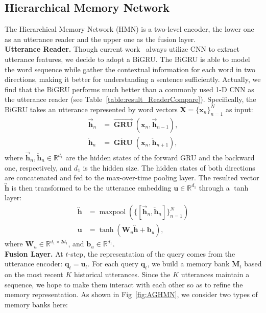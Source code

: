 \documentclass[letterpaper]{article} %
\DeclareMathOperator{\GRU}{\mathbf{GRU}}
\DeclareMathOperator{\maxpool}{maxpool}
\begin{document}
\subsection{Hierarchical Memory Network}
The Hierarchical Memory Network (HMN) is a two-level encoder, the lower one as an utterance reader and the upper one as the fusion layer. 
\\[1ex]
\noindent\textbf{Utterance Reader.}
Though current work~\cite{DBLP:conf/emnlp/HazarikaPMCZ18,DBLP:conf/naacl/HazarikaPZCMZ18,DBLP:conf/aaai/MajumderPHMGC19} always utilize CNN to extract utterance features, we decide to adopt a BiGRU. The BiGRU is able to model the word sequence while gather the contextual information for each word in two directions, making it better for understanding a sentence sufficiently. Actually, we find that the BiGRU performs much better than a commonly used 1-D CNN as the utterance reader (see Table~\ref{table:result_ReaderCompare}). Specifically, the BiGRU takes an utterance represented by word vectors $\mathbf{X}=\{\mathbf{x}_n\}_{n=1}^{N}$ as input:
\begin{align}
    \overrightarrow{\mathbf{h}}_{n} &= \overrightarrow{\GRU}(\mathbf{x}_n, \overrightarrow{\mathbf{h}}_{n-1}), \\
    \overleftarrow{\mathbf{h}}_{n} &= \overleftarrow{\GRU}(\mathbf{x}_n, \overleftarrow{\mathbf{h}}_{n+1}),
\end{align}
where $\overrightarrow{\mathbf{h}}_{n},\overleftarrow{\mathbf{h}}_{n}\in\mathbb{R}^{d_1}$ are the hidden states of the forward GRU and the backward one, respectively, and $d_1$ is the hidden size. The hidden states of both directions are concatenated and fed to the max-over-time pooling layer. The resulted vector $\overleftrightarrow{\mathbf{h}}$ is then transformed to be the utterance embedding $\mathbf{u}\in \mathbb{R}^{d_1}$ through a $\tanh$ layer:
\begin{align}
\overleftrightarrow{\mathbf{h}} &= \maxpool(\{[\overrightarrow{\mathbf{h}}_{n},\overleftarrow{\mathbf{h}}_{n}]\}_{n=1}^N) \\
\mathbf{u} &= \tanh(\mathbf{W}_u\overleftrightarrow{\mathbf{h}} + \mathbf{b}_u),
\end{align}
where $\mathbf{W}_u\in \mathbb{R}^{d_1\times 2d_1}$, and $\mathbf{b}_u\in \mathbb{R}^{d_1}$.
\\[1ex]
\noindent\textbf{Fusion Layer.}
At $t$-step, the representation of the query comes from the utterance encoder: $\mathbf{q}_t = \mathbf{u}_t$.
For each query $\mathbf{q}_t$, we build a memory bank $\mathbf{M}_t$ based on the most recent $K$ historical utterances. Since the $K$ utterances maintain a sequence, we hope to make them interact with each other so as to refine the memory representation. As shown in Fig~\ref{fig:AGHMN}, we consider two types of memory banks here:
\end{document}
